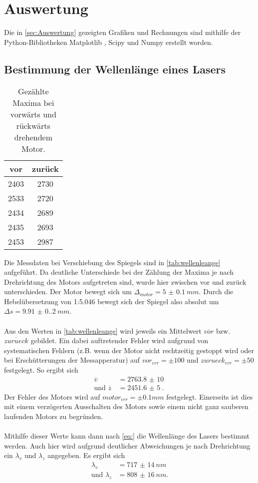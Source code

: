 \section{Auswertung}
\label{sec:Auswertung}
Die in \autoref{sec:Auswertung} gezeigten Grafiken und Rechnungen sind mithilfe der Python-Bibliotheken Matplotlib \cite{matplotlib}, Scipy \cite{scipy} und Numpy \cite{numpy}
erstellt worden.

\subsection{Bestimmung der Wellenlänge eines Lasers}
\begin{table}[H]
  \centering
  \caption{Gezählte Maxima bei vorwärts und rückwärts drehendem Motor.}
  \begin{tabular}{c c}
      \toprule
      vor & zurück\\
      \midrule
      2403 & 2730\\
      2533 & 2720\\
      2434 & 2689\\
      2435 & 2693\\
      2453 & 2987\\
      \bottomrule
  \end{tabular}
  \label{tab:wellenleange}
\end{table}
Die Messdaten bei Verschiebung des Spiegels sind in \autoref{tab:wellenleange} aufgeführt. Da deutliche Unterschiede bei der Zählung der 
Maxima je nach Drehrichtung des Motors aufgetreten sind, wurde hier zwischen vor und zurück unterschieden. Der Motor bewegt sich um 
$\Delta_{motor} = \SI{5(0.1)}{mm}$. Durch die Hebelübersetzung von 1:5.046 bewegt sich der Spiegel also absolut um $\Delta s = \SI{9.91(0.2)}{mm}$.
\\
\\
Aus den Werten in \autoref{tab:wellenleange} wird jeweils ein Mittelwert $\overline{vor}$ bzw. $\overline{zurueck}$ gebildet. Ein dabei auftretender Fehler wird aufgrund von 
systematischen Fehlern (z.B. wenn der Motor nicht rechtzeitig gestoppt wird oder bei Erschütterungen der Messapperatur) auf $vor_{err} = \pm 100$ und $zurueck_{err} = \pm 50$ festgelegt.
So ergibt sich 
\begin{align*}
  \overline{v} &= \SI{2763.8(100)}{}\\
  \text{und } \overline{z}\, &= \SI{2451.6(50)}{}.
\end{align*}
Der Fehler des Motors wird auf $motor_{err} = \pm 0.1 \unit{mm}$ festgelegt. Einerseits ist dies mit einem verzögerten Ausschalten des Motors sowie einem nicht
ganz sauberen laufenden Motors zu begründen.
\\
\\
Mithilfe dieser Werte kann dann nach \autoref{eq:} die Wellenlänge des Lasers bestimmt werden. Auch hier wird aufgrund deutlicher Abweichungen je nach Drehrichtung
ein $\lambda_{v}$ und $\lambda_{z}$ angegeben.
Es ergibt sich 
\begin{align*}
  \lambda_{v} &= \SI{717(14)}{nm}\\
  \text{und } \lambda_{z} &= \SI{808(16)}{nm}.
\end{align*}

